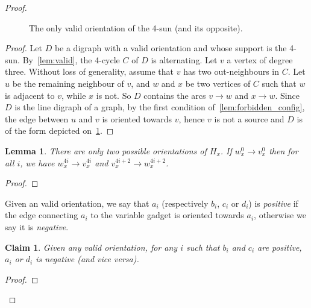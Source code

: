 \documentclass[11pt,a4aper]{article}
\newtheorem{lemma}[theorem]{Lemma}
\newtheorem{claim}[theorem]{Claim}
\begin{document}
\begin{proof}
\begin{figure}[ht]
    \caption{The only valid orientation of the 4-sun (and its opposite).}
    \label{fig:sun_orientation}
  \end{figure}
  \begin{proof}
    Let $D$ be a digraph with a valid orientation and whose support is the
    4-sun. By~\cref{lem:valid}, the 4-cycle $C$ of $D$ is alternating. Let $v$ a
    vertex of degree three. Without loss of generality, assume that $v$ has two
    out-neighbours in $C$. Let $u$ be the remaining neighbour of $v$, and $w$
    and $x$ be two vertices of $C$ such that $w$ is adjacent to $v$, while $x$
    is not. So $D$ contains the arcs $v \to w$ and $x \to w$. Since $D$ is the
    line digraph of a graph, by the first condition
    of~\cref{lem:forbidden_config}, the edge between $u$ and $v$ is oriented
    towards $v$, hence $v$ is not a source and $D$ is of the form depicted on~\cref{fig:sun_orientation}. 
  \end{proof}

  
  \begin{lemma}\label{lem:variable_alternating}
    There are only two possible orientations of $H_x$. If $w_x^0 \to v_x^0$ then
    for all $i$, we have $w_x^{4i} \to v_x^{4i}$ and
    $v_x^{4i+2} \to w_x^{4i+2}$.
  \end{lemma}
  \begin{proof}
  \end{proof}

  
  Given an valid orientation, we say that $a_i$ (respectively $b_i$, $c_i$ or
  $d_i$) is \emph{positive} if the edge connecting $a_i$ to the variable gadget
  is oriented towards $a_i$, otherwise we say it is \emph{negative}.
  \begin{claim}
    Given any valid orientation, for any $i$ such that $b_i$ and $c_i$ are
    positive, $a_i$ or $d_i$ is negative (and vice versa).
  \end{claim}

  \begin{proof}
  \end{proof}
\end{proof}

\nocite{*}


\end{document}

